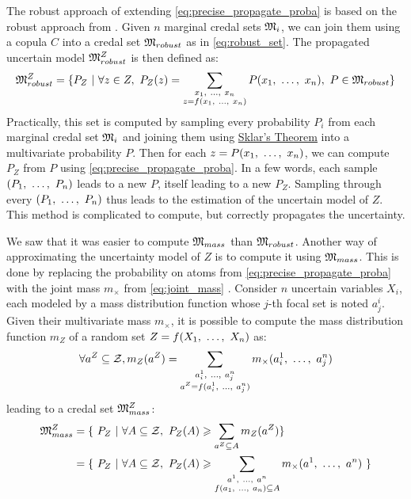 The robust approach of extending \cref{eq:precise_propagate_proba} is based on the robust approach from . Given $n$ marginal credal sets $\mathfrak{M}_i$, we can join them using a copula $C$ into a credal set $\mathfrak{M}_{robust}$ as in \eqref{eq:robust_set}. The propagated uncertain model $\mathfrak{M}^Z_{robust}$ is then defined as:
\begin{align}
    \mathfrak{M}^Z_{robust} = \{P_Z~|~\forall z\in Z, ~P_Z(z)=\sum_{\substack{x_1 , ~\dots, ~ x_n\\z=f(x_1 , ~\dots, ~ x_n)}}P(x_1 , ~\dots, ~ x_n), ~P\in\mathfrak{M}_{robust}\}
\end{align}
Practically, this set is computed by sampling every probability $P_i$ from each marginal credal set $\mathfrak{M}_i$ and joining them using \hyperref[theorem:sklar]{Sklar's Theorem} into a multivariate probability $P$. Then for each $z=P(x_1 , ~\dots, ~ x_n)$, we can compute $P_Z$ from $P$ using \eqref{eq:precise_propagate_proba}. In a few words, each sample $(P_1 , ~\dots, ~ P_n)$ leads to a new $P$, itself leading to a new $P_Z$. Sampling through every $(P_1 , ~\dots, ~ P_n)$ thus leads to the estimation of the uncertain model of $Z$. This method is complicated to compute, but correctly propagates the uncertainty.

We saw that it was easier to compute $\mathfrak{M}_{mass}$ than $\mathfrak{M}_{robust}$. Another way of approximating the uncertainty model of $Z$ is to compute it using $\mathfrak{M}_{mass}$. This is done by replacing the probability on atoms from \cref{eq:precise_propagate_proba} with the joint mass $m_\times$ from \cref{eq:joint_mass} \cite{gray_dependent_2021}. Consider $n$ uncertain variables $X_i$, each modeled by a mass distribution function whose $j$-th focal set is noted $a^i_j$. Given their multivariate mass $m_\times$, it is possible to compute the mass distribution function $m_Z$ of a random set $Z=f(X_1 , ~\dots, ~ X_n)$ as:
\begin{align}
    \forall a^Z\subseteq\mathcal{Z}, m_Z(a^Z) = \sum_{\substack{a^1_i , ~\dots, ~ a^n_j\\a^Z=f(a^1_i , ~\dots, ~  a^n_j)}}m_\times(a^1_i , ~\dots, ~ a^n_j)\label{eq:mass_propagated}
\end{align}
leading to a credal set $\mathfrak{M}_{mass}^Z$:
\begin{align}
    \mathfrak{M}_{mass}^Z &= \{~P_Z~|~\forall A\subseteq\mathcal{Z},~P_Z(A)\geqslant \sum_{a^Z\subseteq A}m_Z(a^Z)\}\\
    &=\{~P_Z~|~\forall A\subseteq\mathcal{Z},~P_Z(A)\geqslant \sum_{\substack{a^1, ~\dots, ~ a^n \\ f(a_1, ~\dots, ~ a_n)\subseteq A}}m_\times(a^1, ~\dots, ~ a^n)~\}
\end{align}

